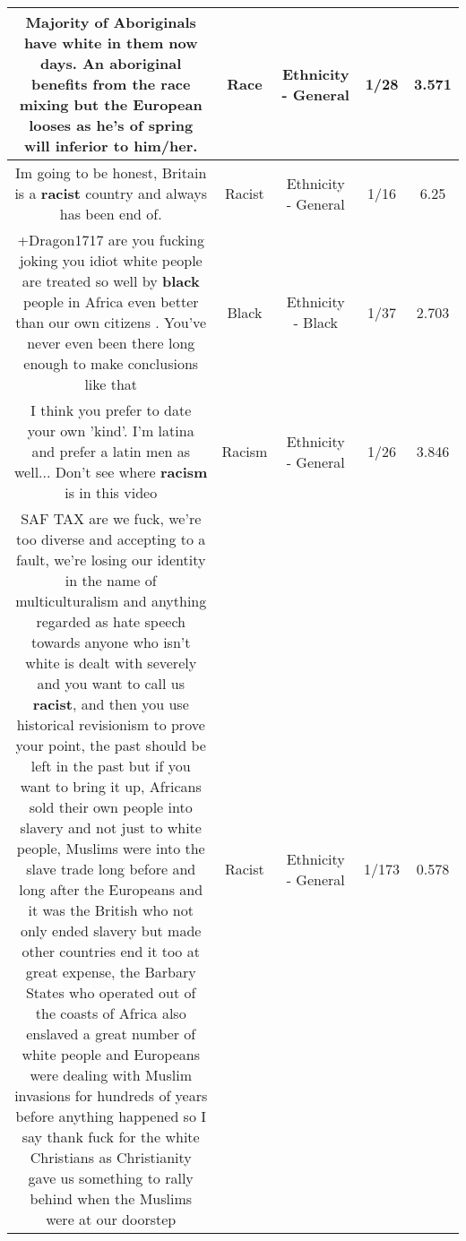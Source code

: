 \documentclass[11pt]{article}
\newlength\mylength
\begin{document}
\begin{center}
\begin{longtable}{|C{.65\mylength}|C{.30\mylength}|C{.12\mylength}|C{.12\mylength}|C{.12\mylength}|}
  \small Majority of Aboriginals have white in them now days.  An aboriginal benefits from the \textbf{race} mixing but the European looses as he's of spring will inferior to him/her.\normalsize   & Race & Ethnicity - General & 1/28 & 3.571 \\  \hline
  \small Im going to be honest, Britain is a \textbf{racist} country and always has been end of.\normalsize   & Racist & Ethnicity - General & 1/16 & 6.25 \\  \hline
  \small +Dragon1717 are you fucking joking you idiot white people are treated so well by \textbf{black} people in Africa even better than our own citizens . You've never even been there long enough to make conclusions like that\normalsize   & Black & Ethnicity - Black & 1/37 & 2.703 \\  \hline
  \small I think you prefer to date your own 'kind'. I'm latina and prefer a latin men as well... Don't see where \textbf{racism} is in this video\normalsize   & Racism & Ethnicity - General & 1/26 & 3.846 \\  \hline
  \small SAF TAX are we fuck, we're too diverse and accepting to a fault, we're losing our identity in the name of multiculturalism and anything regarded as hate speech towards anyone who isn't white is dealt with severely and you want to call us \textbf{racist}, and then you use historical revisionism to prove your point, the past should be left in the past but if you want to bring it up, Africans sold their own people into slavery and not just to white people, Muslims were into the slave trade long before and long after the Europeans and it was the British who not only ended slavery but made other countries end it too at great expense, the Barbary States who operated out of the coasts of Africa also enslaved a great number of white people and Europeans were dealing with Muslim invasions for hundreds of years before anything happened so I say thank fuck for the white Christians as Christianity gave us something to rally behind when the Muslims were at our doorstep\normalsize   & Racist & Ethnicity - General & 1/173 & 0.578 \\  \hline

\end{longtable}
\end{center}
\end{document}
